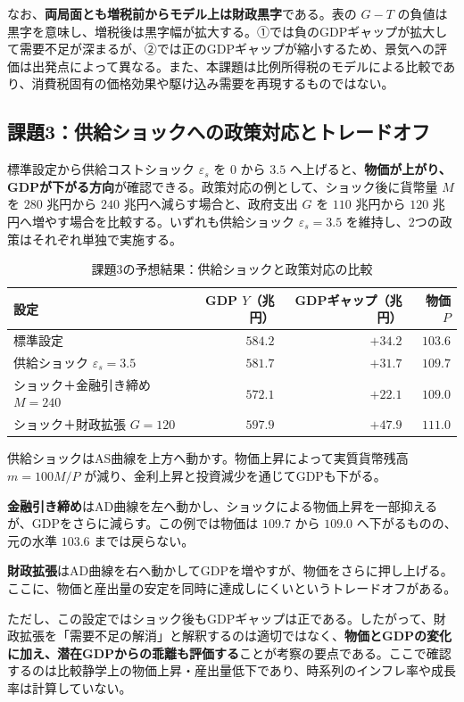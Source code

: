 \documentclass[lualatex,a4paper,11pt,ja=standard]{bxjsarticle}
\begin{document}
なお、\textbf{両局面とも増税前からモデル上は財政黒字}である。表の $G-T$ の負値は黒字を意味し、増税後は黒字幅が拡大する。①では負のGDPギャップが拡大して需要不足が深まるが、②では正のGDPギャップが縮小するため、景気への評価は出発点によって異なる。また、本課題は比例所得税のモデルによる比較であり、消費税固有の価格効果や駆け込み需要を再現するものではない。

\clearpage
\subsection{課題3：供給ショックへの政策対応とトレードオフ}

標準設定から供給コストショック $\varepsilon_s$ を $0$ から $3.5$ へ上げると、\textbf{物価が上がり、GDPが下がる方向}が確認できる。政策対応の例として、ショック後に貨幣量 $M$ を $280$ 兆円から $240$ 兆円へ減らす場合と、政府支出 $G$ を $110$ 兆円から $120$ 兆円へ増やす場合を比較する。いずれも供給ショック $\varepsilon_s=3.5$ を維持し、2つの政策はそれぞれ単独で実施する。

\begin{table}[htbp]
\centering
\caption{課題3の予想結果：供給ショックと政策対応の比較}
\label{tab:expected_supply}
\small
\begin{tabular}{@{}lrrr@{}}
\toprule
\textbf{設定} & \textbf{GDP $Y$（兆円）} & \textbf{GDPギャップ（兆円）} & \textbf{物価 $P$} \\
\midrule
標準設定 & $584.2$ & $+34.2$ & $103.6$ \\
供給ショック $\varepsilon_s=3.5$ & $581.7$ & $+31.7$ & $109.7$ \\
ショック＋金融引き締め $M=240$ & $572.1$ & $+22.1$ & $109.0$ \\
ショック＋財政拡張 $G=120$ & $597.9$ & $+47.9$ & $111.0$ \\
\bottomrule
\end{tabular}
\end{table}

供給ショックはAS曲線を上方へ動かす。物価上昇によって実質貨幣残高 $m=100M/P$ が減り、金利上昇と投資減少を通じてGDPも下がる。

\textbf{金融引き締め}はAD曲線を左へ動かし、ショックによる物価上昇を一部抑えるが、GDPをさらに減らす。この例では物価は $109.7$ から $109.0$ へ下がるものの、元の水準 $103.6$ までは戻らない。

\textbf{財政拡張}はAD曲線を右へ動かしてGDPを増やすが、物価をさらに押し上げる。ここに、物価と産出量の安定を同時に達成しにくいというトレードオフがある。

ただし、この設定ではショック後もGDPギャップは正である。したがって、財政拡張を「需要不足の解消」と解釈するのは適切ではなく、\textbf{物価とGDPの変化に加え、潜在GDPからの乖離も評価する}ことが考察の要点である。ここで確認するのは比較静学上の物価上昇・産出量低下であり、時系列のインフレ率や成長率は計算していない。
\end{document}
